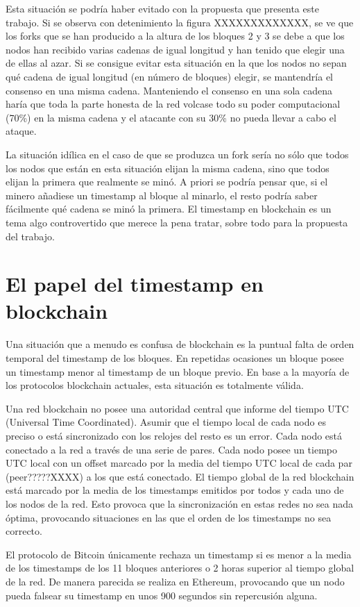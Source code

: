 Esta situación se podría haber evitado con la propuesta que presenta este trabajo. Si se observa con detenimiento la figura XXXXXXXXXXXXX, se ve que los forks que se han producido a la altura de los bloques 2 y 3 se debe a que los nodos han recibido varias cadenas de igual longitud y han tenido que elegir una de ellas al azar. Si se consigue evitar esta situación en la que los nodos no sepan qué cadena de igual longitud (en número de bloques) elegir, se mantendría el consenso en una misma cadena. Manteniendo el consenso en una sola cadena haría que toda la parte honesta de la red volcase todo su poder computacional (70\%) en la misma cadena y el atacante con su 30\% no pueda llevar a cabo el ataque. \newline

La situación idílica en el caso de que se produzca un fork sería no sólo que todos los nodos que están en esta situación elijan la misma cadena, sino que todos elijan la primera que realmente se minó. A priori se podría pensar que, si el minero añadiese un timestamp al bloque al minarlo, el resto podría saber fácilmente qué cadena se minó la primera. El timestamp en blockchain es un tema algo controvertido que merece la pena tratar, sobre todo para la propuesta del trabajo.\newline

\section{El papel del timestamp en blockchain}
Una situación que a menudo es confusa de blockchain es la puntual falta de orden temporal del timestamp de los bloques. En repetidas ocasiones un bloque posee un timestamp menor al timestamp de un bloque previo. En base a la mayoría de los protocolos blockchain actuales, esta situación es totalmente válida. \newline

Una red blockchain no posee una autoridad central que informe del tiempo UTC (Universal Time Coordinated). Asumir que el tiempo local de cada nodo es preciso o está sincronizado con los relojes del resto es un error. Cada nodo está conectado a la red a través de una serie de pares. Cada nodo posee un tiempo UTC local con un offset marcado por la media del tiempo UTC local de cada par (peer?????XXXX) a los que está conectado. El tiempo global de la red blockchain está marcado por la media de los timestamps emitidos por todos y cada uno de los nodos de la red. Esto provoca que la sincronización en estas redes no sea nada óptima, provocando situaciones en las que el orden de los timestamps no sea correcto. \newline

El protocolo de Bitcoin únicamente rechaza un timestamp si es menor a la media de los timestamps de los 11 bloques anteriores o 2 horas superior al tiempo global de la red. De manera parecida se realiza en Ethereum, provocando que un nodo pueda falsear su timestamp en unos 900 segundos sin repercusión alguna.

